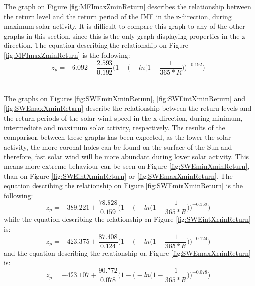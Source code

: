 \documentclass[12pt]{article}
\begin{document}
        The graph on Figure \ref{fig:MFImaxZminReturn} describes the relationship between the return level and the return period of the IMF in the z-direction, during maximum solar activity. It is difficult to compare this graph to any of the other graphs in this section, since this is the only graph displaying properties in the z-direction. The equation describing the relationship on Figure \ref{fig:MFImaxZminReturn} is the following:
        \begin{equation}
            z_p = -6.092+\frac{2.593}{0.192}\Bigg( 1-\Bigg( -ln\Bigg( 1-\frac{1}{365*R}\Bigg) \Bigg) ^{-0.192}\Bigg)
        \end{equation}\\ \\
        The graphs on Figures \ref{fig:SWEminXminReturn}, \ref{fig:SWEintXminReturn} and \ref{fig:SWEmaxXminReturn} describe the relationship between the return levels and the return periods of the solar wind speed in the x-direction, during minimum, intermediate and maximum solar activity, respectively. The results of the comparison between these graphs has been expected, as the lower the solar activity, the more coronal holes can be found on the surface of the Sun and therefore, fast solar wind will be more abundant during lower solar activity. This means more extreme behaviour can be seen on Figure \ref{fig:SWEminXminReturn}, than on Figure \ref{fig:SWEintXminReturn} or \ref{fig:SWEmaxXminReturn}. The equation describing the relationship on Figure \ref{fig:SWEminXminReturn} is the following:
        \begin{equation}
            z_p = -389.221+\frac{78.528}{0.159}\Bigg( 1-\Bigg( -ln\Bigg( 1-\frac{1}{365*R}\Bigg) \Bigg) ^{-0.159}\Bigg)
        \end{equation}
        while the equation describing the relationship on Figure \ref{fig:SWEintXminReturn} is:
        \begin{equation}
            z_p = -423.375+\frac{87.408}{0.124}\Bigg( 1-\Bigg( -ln\Bigg( 1-\frac{1}{365*R}\Bigg) \Bigg) ^{-0.124}\Bigg)
        \end{equation}
        and the equation describing the relationship on Figure \ref{fig:SWEmaxXminReturn} is:
        \begin{equation}
            z_p = -423.107+\frac{90.772}{0.078}\Bigg( 1-\Bigg( -ln\Bigg( 1-\frac{1}{365*R}\Bigg) \Bigg) ^{-0.078}\Bigg)
        \end{equation}
\end{document}
